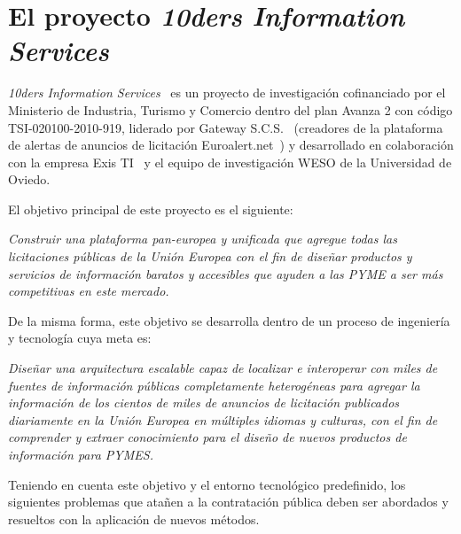 \documentclass[a4paper,twoside,12pt]{report}
\begin{document}
\section{El proyecto \textit{10ders Information Services}}\label{10ders}
\textit{\gls{10ders} Information Services}~\cite{10ders} es un proyecto de investigación
cofinanciado por el Ministerio de Industria, Turismo y Comercio dentro del plan Avanza 2 
con código TSI-020100-2010-919, liderado por Gateway S.C.S.~\cite{gateway} (creadores de la plataforma
de alertas de anuncios de licitación Euroalert.net~\cite{euroalert}) y desarrollado en colaboración con la empresa Exis TI~\cite{exis} y el equipo
de investigación \gls{WESO} de la Universidad de Oviedo. 

El objetivo principal de este proyecto es el siguiente:

\textit{Construir una plataforma pan-europea y unificada que agregue todas
las licitaciones públicas de la Unión \gls{Europea} con el fin de diseñar productos y
servicios de información baratos y accesibles que ayuden a las \gls{PYME} a
ser más competitivas en este mercado.}

De la misma forma, este objetivo se desarrolla dentro de un proceso de ingeniería
y tecnología cuya meta es:

\textit{Diseñar una arquitectura escalable capaz de localizar e interoperar con miles
de fuentes de información públicas completamente heterogéneas para agregar
la información de los cientos de miles de anuncios de licitación publicados
diariamente en la Unión Europea en múltiples idiomas y culturas, con el fin de
comprender y extraer conocimiento para el diseño de nuevos productos de
información para PYMES.}

Teniendo en cuenta este objetivo y el entorno tecnológico predefinido, los siguientes
problemas que atañen a la contratación pública deben ser abordados y resueltos con la
aplicación de nuevos métodos.
\end{document}
